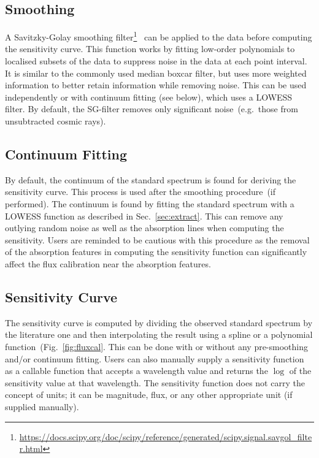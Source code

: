 \documentclass[fleqn,usenatbib]{mnras}
\begin{document}
\subsection*{Smoothing}
A Savitzky-Golay smoothing
filter\footnote{\url{https://docs.scipy.org/doc/scipy/reference/generated/scipy.signal.savgol_filter.html}}~\citep[hereafter, SG-filter]{1964AnaCh..36.1627S}
can be applied to the data before computing the sensitivity curve.
This function works by fitting low-order polynomials to localised
subsets of the data to suppress noise in the data at each point
interval. It is similar to the commonly used median boxcar filter,
but uses more weighted information to better
retain information while removing noise. This can be
used independently or with continuum fitting (see below), which
uses a LOWESS filter. By default, the SG-filter removes only
significant noise~(e.g.\ those from unsubtracted cosmic rays).

\subsection*{Continuum Fitting}
By default, the continuum of the standard spectrum is found for
deriving the sensitivity curve. This process is used after the
smoothing procedure~(if performed). The continuum is found by
fitting the standard spectrum with a LOWESS function as described in
Sec.~\ref{sec:extract}. This can remove any outlying random noise
as well as the absorption lines when computing the sensitivity. Users
are reminded to be cautious with this procedure as the removal of the
absorption features in computing the sensitivity function can
significantly affect the flux calibration near the absorption features.

\subsection*{Sensitivity Curve}
The sensitivity curve is computed by dividing the observed standard
spectrum by the literature one and then interpolating the result using a
spline or a polynomial function~(Fig.~\ref{fig:fluxcal}. This can be
done with or without any pre-smoothing and/or continuum fitting. Users
can also manually supply a sensitivity function as a callable function
that accepts a wavelength value and returns the $\log$ of the sensitivity
value at that wavelength. The sensitivity function does not carry the
concept of units; it can be magnitude, flux, or any other appropriate
unit (if supplied manually).
\end{document}
